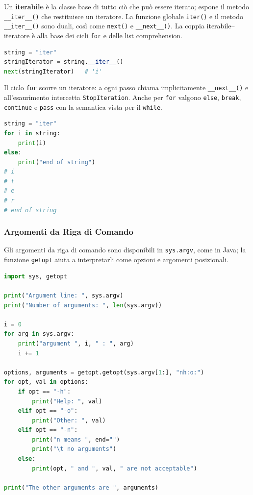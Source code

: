 \documentclass[12pt]{extarticle}
\begin{document}
\noindent Un \textbf{iterabile} è la classe base di tutto ciò che può essere iterato; espone il metodo \texttt{\_\_iter\_\_()} che restituisce un iteratore. La funzione globale \texttt{iter()} e il metodo \texttt{\_\_iter\_\_()} sono duali, così come \texttt{next()} e \texttt{\_\_next\_\_()}. La coppia iterabile--iteratore è alla base dei cicli \texttt{for} e delle list comprehension.

\begin{lstlisting}[language=Python]
string = "iter"
stringIterator = string.__iter__()
next(stringIterator)   # 'i'
\end{lstlisting}

\noindent Il ciclo \texttt{for} scorre un iteratore: a ogni passo chiama implicitamente \texttt{\_\_next\_\_()} e all'esaurimento intercetta \texttt{StopIteration}. Anche per \texttt{for} valgono \texttt{else}, \texttt{break}, \texttt{continue} e \texttt{pass} con la semantica vista per il \texttt{while}.

\begin{lstlisting}[language=Python]
string = "iter"
for i in string:
    print(i)
else:
    print("end of string")
# i
# t
# e
# r
# end of string
\end{lstlisting}

\subsubsection{Argomenti da Riga di Comando}

\noindent Gli argomenti da riga di comando sono disponibili in \texttt{sys.argv}, come in Java; la funzione \texttt{getopt} aiuta a interpretarli come opzioni e argomenti posizionali.

\begin{lstlisting}[language=Python]
import sys, getopt

print("Argument line: ", sys.argv)
print("Number of arguments: ", len(sys.argv))

i = 0
for arg in sys.argv:
    print("argument ", i, " : ", arg)
    i += 1

options, arguments = getopt.getopt(sys.argv[1:], "nh:o:")
for opt, val in options:
    if opt == "-h":
        print("Help: ", val)
    elif opt == "-o":
        print("Other: ", val)
    elif opt == "-n":
        print("n means ", end="")
        print("\t no arguments")
    else:
        print(opt, " and ", val, " are not acceptable")

print("The other arguments are ", arguments)
\end{lstlisting}
\end{document}
